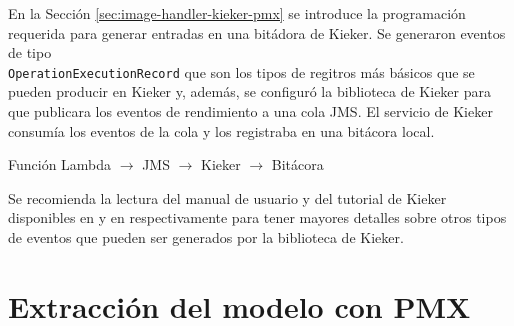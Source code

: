 En la Sección \ref{sec:image-handler-kieker-pmx} se introduce la programación requerida para generar entradas en una bitádora de Kieker. Se generaron eventos de tipo\\ \texttt{OperationExecutionRecord} que son los tipos de regitros más básicos que se pueden producir en Kieker y, además, se configuró la biblioteca de Kieker para que publicara los eventos de rendimiento a una cola JMS. El servicio de Kieker consumía los eventos de la cola y los registraba en una bitácora local.

\begin{center}
Función Lambda $\rightarrow$ JMS $\rightarrow$ Kieker $\rightarrow$ Bitácora
\end{center}

Se recomienda la lectura del manual de usuario y del tutorial de Kieker disponibles en \cite{kieker-user-guide} y en \cite{kieker-icpe-tutorial-2014} respectivamente para tener mayores detalles sobre otros tipos de eventos que pueden ser generados por la biblioteca de Kieker.

\section{Extracción del modelo con PMX}

